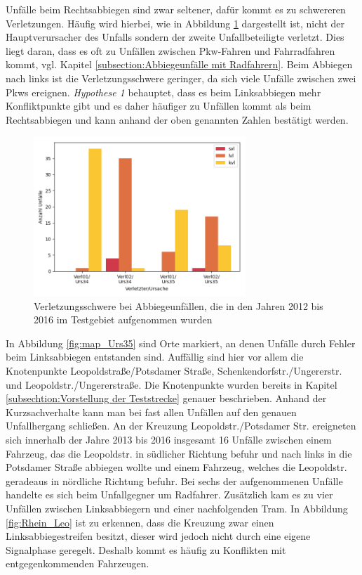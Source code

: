 Unfälle beim Rechtsabbiegen sind zwar seltener, dafür kommt es zu schwereren Verletzungen. Häufig wird hierbei, wie in Abbildung \ref{fig:Abbiegen_Verletzungen} dargestellt ist, nicht der Hauptverursacher des Unfalls sondern der zweite Unfallbeteiligte verletzt. Dies liegt daran, dass es oft zu Unfällen zwischen Pkw-Fahren und Fahrradfahren kommt, vgl. Kapitel \ref{subsection:Abbiegeunfälle mit Radfahrern}. Beim Abbiegen nach links ist die Verletzungsschwere geringer, da sich viele Unfälle zwischen zwei Pkws ereignen. \textit{Hypothese 1} behauptet, dass es beim Linksabbiegen mehr Konfliktpunkte gibt und es daher häufiger zu Unfällen kommt als beim Rechtsabbiegen und kann anhand der oben genannten Zahlen bestätigt werden.

\begin{savenotes}
	\begin{figure}[H]
		\centering
		\includegraphics[width=8cm,height=6cm]{figures/Abbiegen_Verletzung}
		\caption[Verletzungsschwere der Unfallbeteiligten bei Abbiegeunfällen, die in den Jahren 2012 bis 2016 im Testgebiet aufgenommen wurden]{Verletzungsschwere bei Abbiegeunfällen, die in den Jahren 2012 bis 2016 im Testgebiet aufgenommen wurden}\label{fig:Abbiegen_Verletzungen}
	\end{figure}
\end{savenotes}

In Abbildung \ref{fig:map_Urs35} sind Orte markiert, an denen Unfälle durch Fehler beim Linksabbiegen entstanden sind. Auffällig sind hier vor allem die Knotenpunkte Leopoldstraße/Potsdamer Straße, Schenkendorfstr./Ungererstr. und Leopoldstr./Ungererstraße. Die Knotenpunkte wurden bereits in Kapitel \ref{subsechtion:Vorstellung der Teststrecke} genauer beschrieben. Anhand der Kurzsachverhalte kann man bei fast allen Unfällen auf den genauen Unfallhergang schließen. An der Kreuzung Leopoldstr./Potsdamer Str. ereigneten sich innerhalb der Jahre 2013 bis 2016 insgesamt 16 Unfälle zwischen einem Fahrzeug, das die Leopoldstr. in südlicher Richtung befuhr und nach links in die Potsdamer Straße abbiegen wollte und einem Fahrzeug, welches die Leopoldstr. geradeaus in nördliche Richtung befuhr. Bei sechs der aufgenommenen Unfälle handelte es sich beim Unfallgegner um Radfahrer. Zusätzlich kam es zu vier Unfällen zwischen Linksabbiegern und einer nachfolgenden Tram. In Abbildung \ref{fig:Rhein_Leo} ist zu erkennen, dass die Kreuzung zwar einen Linksabbiegestreifen besitzt, dieser wird jedoch nicht durch eine eigene Signalphase geregelt. Deshalb kommt es häufig zu Konflikten mit entgegenkommenden Fahrzeugen.

